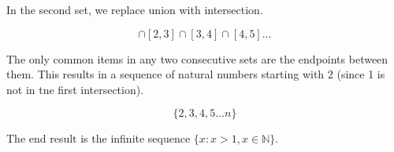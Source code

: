 \documentclass{article}
\begin{document}
In the second set, we replace union with intersection.

\begin{equation}
	[1,2]\cap[2,3]\cap[3,4]\cap[4,5]...
\end{equation}

The only common items in any two consecutive sets are the endpoints between them.
This results in a sequence of natural numbers starting with 2 (since 1 is not in tne first intersection).

\begin{equation}
	\{2,3,4,5...n\}
\end{equation}

The end result is the infinite sequence $\{x: x > 1, x \in \mathbb{N}\}$.
\end{document}
